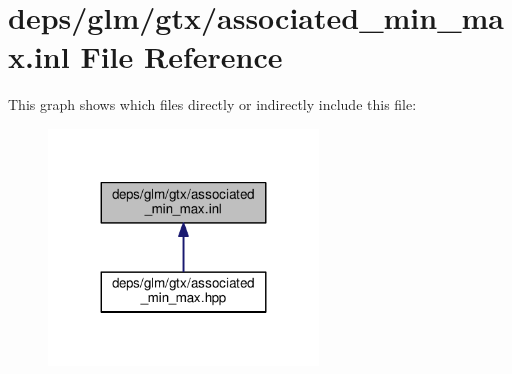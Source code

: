 \hypertarget{associated__min__max_8inl}{}\section{deps/glm/gtx/associated\+\_\+min\+\_\+max.inl File Reference}
\label{associated__min__max_8inl}
This graph shows which files directly or indirectly include this file\+:
\nopagebreak
\begin{figure}[H]
\begin{center}
\leavevmode
\includegraphics[width=203pt]{de/d14/associated__min__max_8inl__dep__incl}
\end{center}
\end{figure}
